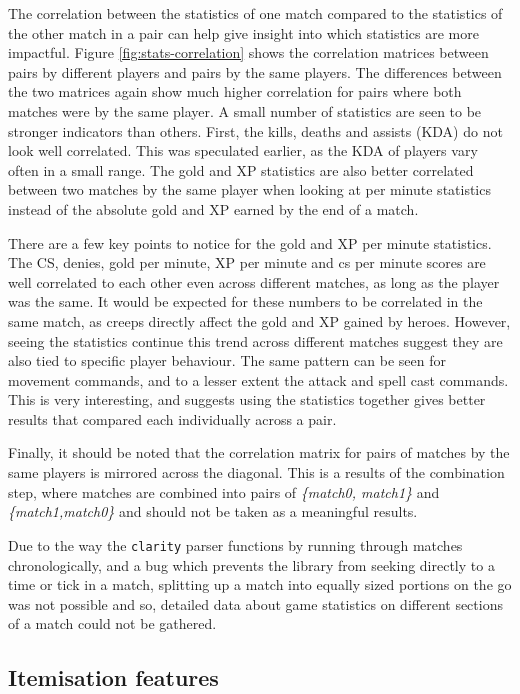\documentclass[Report.tex]{subfiles}
\begin{document}
The correlation between the statistics of one match compared to the statistics of the other match in a pair can help give insight into which statistics are more impactful. Figure \ref{fig:stats-correlation} shows the correlation matrices between pairs by different players and pairs by the same players. The differences between the two matrices again show much higher correlation for pairs where both matches were by the same player. A small number of statistics are seen to be stronger indicators than others. First, the kills, deaths and assists (KDA) do not look well correlated. This was speculated earlier, as the KDA of players vary often in a small range. The gold and XP statistics are also better correlated between two matches by the same player when looking at per minute statistics instead of the absolute gold and XP earned by the end of a match. 

There are a few key points to notice for the gold and XP per minute statistics. The CS, denies, gold per minute, XP per minute and cs per minute scores are well correlated to each other even across different matches, as long as the player was the same. It would be expected for these numbers to be correlated in the same match, as creeps directly affect the gold and XP gained by heroes. However, seeing the statistics continue this trend across different matches suggest they are also tied to specific player behaviour. The same pattern can be seen for movement commands, and to a lesser extent the attack and spell cast commands. This is very interesting, and suggests using the statistics together gives better results that compared each individually across a pair. 

Finally, it should be noted that the correlation matrix for pairs of matches by the same players is mirrored across the diagonal. This is a results of the combination step, where matches are combined into pairs of \textit{\{match0, match1\}} and \textit{\{match1,match0\}} and should not be taken as a meaningful results.


Due to the way the \texttt{clarity} parser functions by running through matches chronologically, and a bug which prevents the library from seeking directly to a time or tick in a match, splitting up a match into equally sized portions on the go was not possible and so, detailed data about game statistics on different sections of a match could not be gathered.  

\subsection{Itemisation features}
\end{document}
